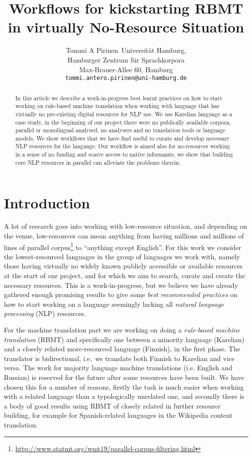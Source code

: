 \documentclass{flammie}
\title{Workflows for kickstarting RBMT in virtually No-Resource Situation}
\author{Tommi A Pirinen\
  Universität Hamburg,\\
  Hamburger Zentrum für Sprachkorpora\\
  Max-Brauer-Allee 60, Hamburg\\
  {\tt tommi.antero.pirinen@uni-hamburg.de}}
\date{}
\begin{document}
\maketitle
\begin{abstract}
    In this article we describe a work-in-progress best learnt practices on how
    to start working on rule-based machine translation when working with
    language that has virtually no pre-existing digital resources for NLP use.
    We use Karelian language as a case study, in the beginning of our project
    there were no publically available corpora, parallel or monolingual
    analysed, no analysers and no translation tools or language models. We show
    workflows that we have find useful to curate and develop necessary NLP
    resources for the language. Our workflow is aimed also for no-resources
    working in a sense of no funding and scarce access to native informants, we
    show that building core NLP resources in parallel can alleviate the problems
    therein.
\end{abstract}

\section{Introduction}

A lot of research goes into working with low-resource situation, and depending
on the venue, low-resources can mean anything from having millions and millions
of lines of parallel
corpus\footnote{\url{http://www.statmt.org/wmt19/parallel-corpus-filtering.html}}
to ``anything except English''. For this work we consider the lowest-resourced
languages in the group of languages we work with, namely those having virtually
no widely known publicly accessible or available resources at the start of our
project, and for which we aim to search, curate and create the necessary
resources. This is a work-in-progress, but we believe we have already gathered
enough promising results to give some \textit{best recommended practices} on
how to start working on a language seemingly lacking all \textit{natural
language processing} (NLP) resources.

For the machine translation part we are working on doing a \textit{rule-based
machine translation} (RBMT) and specifically one between a minority language
(Karelian) and a closely related more-resourced language (Finnish), in the first
phase. The translator is bidirectional, i.e.\ we translate both Finnish to
Karelian and vice versa.  The work for majority language machine translations
(i.e. English and Russian) is reserved for the future after some resources have
been built.  We have chosen this for a number of reasons, firstly the task is
much easier when working with a related language than a typologically unrelated
one, and secondly there is a body of good results using RBMT of closely related
in further resource building, for example for Spanish-related languages in the
Wikipedia content translation.
\end{document}
